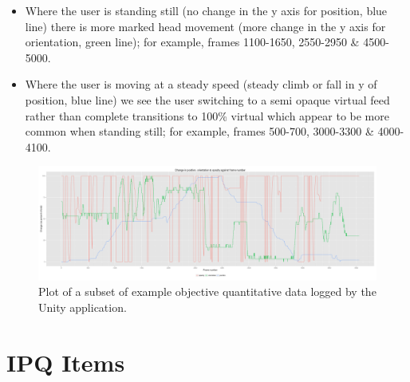 \documentclass[oneside]{book}
\begin{document}
\begin{itemize}
	\item Where the user is standing still (no change in the y axis for position, blue line) there is more marked head movement (more change in the y axis for orientation, green line); for example, frames 1100-1650, 2550-2950 \& 4500-5000.
	\item Where the user is moving at a steady speed (steady climb or fall in y of position, blue line) we see the user switching to a semi opaque virtual feed rather than complete transitions to 100\% virtual which appear to be more common when standing still; for example, frames 500-700, 3000-3300 \& 4000-4100.
\end{itemize}

\pagebreak
\begin{landscape}
\vspace*{\fill}
\begin{figure}[h]
	\thispagestyle{empty}
	\begin{center}
		\includegraphics[width=\linewidth]{images/graph.png}
		\caption{Plot of a subset of example objective quantitative data logged by the Unity application.}
		\label{plot}
	\end{center}
\end{figure}
\vspace*{\fill}
\end{landscape}
\pagebreak

\appendix

\chapter{IPQ Items}

\label{ipqitems}
\end{document}
